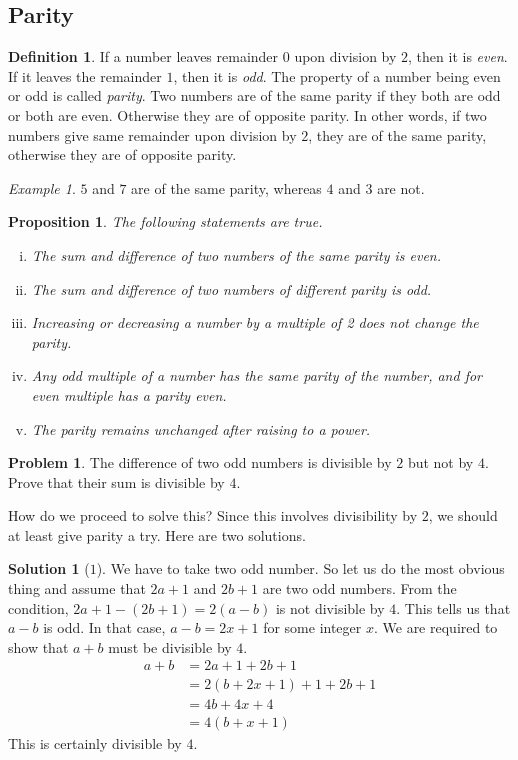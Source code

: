 \documentclass[a4paper, 12pt, leqno]{article}
\newtheorem{proposition}{Proposition}
\theoremstyle{definition}
\newtheorem{definition}{Definition}
\newtheorem{problem}{Problem}
\newtheorem*{solution}{Solution}
\theoremstyle{remark}
\newtheorem*{example}{Example}
\begin{document}
	\subsection{Parity}
		\begin{definition}
			If a number leaves remainder $0$ upon division by $2$, then it is \textit{even}. If it leaves the remainder $1$, then it is  \textit{odd}. The property of a number being even or odd is called \textit{parity}. Two numbers are of the same parity if they both are odd or both are even. Otherwise they are of opposite parity. In other words, if two numbers give same remainder upon division by $2$, they are of the same parity, otherwise they are of opposite parity.
		\end{definition}
		
		\begin{example}
			$5$ and $7$ are of the same parity, whereas $4$ and $3$ are not.
		\end{example}
		
		\begin{proposition}
			The following statements are true.
				\begin{enumerate}[i.]
					\item The sum and difference of two numbers of the same parity is even.
					\item The sum and difference of two numbers of different parity is odd.
					\item Increasing or decreasing a number by a multiple of 2 does not change
					the parity.
					\item Any odd multiple of a number has the same parity of the number, and
					for even multiple has a parity even.
					\item The parity remains unchanged after raising to a power.
				\end{enumerate}
		\end{proposition}
		
		\begin{problem}
			The difference of two odd numbers is divisible by $2$ but not by $4$. Prove
			that their sum is divisible by $4$.
		\end{problem}
	How do we proceed to solve this? Since this involves divisibility by $2$, we should at least give parity a try. Here are two solutions.
		\begin{solution}[$1$]
			We have to take two odd number. So let us do the most obvious thing and assume that $2a+1$ and $2b+1$ are two odd numbers. From the condition, $2a+1-(2b+1)=2(a-b)$ is not divisible by $4$. This tells us that $a-b$ is odd. In that case, $a-b=2x+1$ for some integer $x$. We are required to show that $a+b$ must be divisible by $4$.
				\begin{align*}
					a+b & =2a+1+2b+1\\
						& = 2(b+2x+1)+1+2b+1\\
						& = 4b+4x+4\\
						& = 4(b+x+1)
				\end{align*}
			This is certainly divisible by $4$.
		\end{solution}
	
\end{document}
